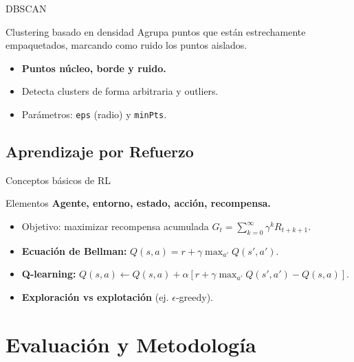 \documentclass[aspectratio=169, 10pt, xcolor=table]{beamer}
\begin{document}
\begin{frame}{DBSCAN}
    \begin{block}{Clustering basado en densidad}
        Agrupa puntos que están estrechamente empaquetados, marcando como ruido los puntos aislados.
    \end{block}
    \begin{itemize}
        \item \textbf{Puntos núcleo, borde y ruido.}
        \item Detecta clusters de forma arbitraria y outliers.
        \item Parámetros: \texttt{eps} (radio) y \texttt{minPts}.
    \end{itemize}
\end{frame}

\subsection{Aprendizaje por Refuerzo}

\begin{frame}{Conceptos básicos de RL}
    \begin{block}{Elementos}
        \textbf{Agente, entorno, estado, acción, recompensa.}
    \end{block}
    \begin{itemize}
        \item Objetivo: maximizar recompensa acumulada $G_t = \sum_{k=0}^\infty \gamma^k R_{t+k+1}$.
        \item \textbf{Ecuación de Bellman:} $Q(s,a) = r + \gamma \max_{a'} Q(s',a')$.
        \item \textbf{Q-learning:} $Q(s,a) \leftarrow Q(s,a) + \alpha [r + \gamma \max_{a'} Q(s',a') - Q(s,a)]$.
        \item \textbf{Exploración vs explotación} (ej. $\epsilon$-greedy).
    \end{itemize}
\end{frame}

\section{Evaluación y Metodología}
\end{document}
